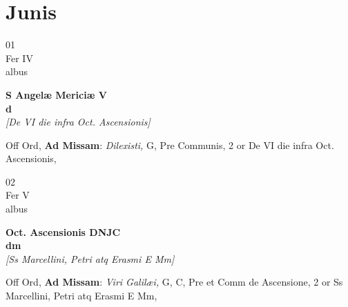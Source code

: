 \documentclass[10pt, openany]{book}
\begin{document}
        \chapter{Junis}
                        
        \begin{center}
            \begin{minipage}{3.5in}
                \vspace{2em}
                \begin{minipage}{0.5in}
                    {\Huge 01} \\
                    {\normalsize Fer IV} \\
                    {\normalsize albus}
                \end{minipage}
                \begin{minipage}{3.0in}
                    \textbf{ \large S Angelæ Mericiæ V \\
                    \textnormal{\normalsize d}} \\ \textit{[De VI die infra Oct. Ascensionis]} \\ 
                \end{minipage}
                \begin{justify}Off Ord, \textbf{Ad Missam}: \textit{Dilexisti,} G, Pre Communis, 2 or De VI die infra Oct. Ascensionis,   
                \end{justify}
            \end{minipage}
        \end{center}
    
        \begin{center}
            \begin{minipage}{3.5in}
                \vspace{2em}
                \begin{minipage}{0.5in}
                    {\Huge 02} \\
                    {\normalsize Fer V} \\
                    {\normalsize albus}
                \end{minipage}
                \begin{minipage}{3.0in}
                    \textbf{ \large Oct. Ascensionis DNJC \\
                    \textnormal{\normalsize dm}} \\ \textit{[Ss Marcellini, Petri atq Erasmi E Mm]} \\ 
                \end{minipage}
                \begin{justify}Off Ord, \textbf{Ad Missam}: \textit{Viri Galilæi,} G, C, Pre et Comm de Ascensione, 2 or Ss Marcellini, Petri atq Erasmi E Mm,   
                \end{justify}
            \end{minipage}
        \end{center}
    
\end{document}

